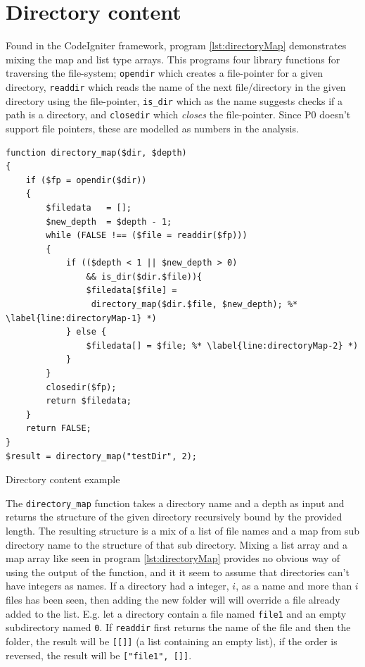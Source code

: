 \section{Directory content}
\label{sec:directoryContent}
Found in the CodeIgniter framework, program \ref{lst:directoryMap} demonstrates mixing the map and list type arrays. This programs four library functions for traversing the file-system; \texttt{opendir} which creates a file-pointer for a given directory, \texttt{readdir} which reads the name of the next file/directory in the given directory using the file-pointer, \texttt{is\_dir} which as the name suggests checks if a path is a directory, and \texttt{closedir} which \emph{closes} the file-pointer. Since P0 doesn't support file pointers, these are modelled as numbers in the analysis. 


\begin{program}
\begin{lstlisting}
function directory_map($dir, $depth)
{
    if ($fp = opendir($dir))
    {
        $filedata	= [];
        $new_depth	= $depth - 1;
        while (FALSE !== ($file = readdir($fp)))
        {
            if (($depth < 1 || $new_depth > 0) 
                && is_dir($dir.$file)){
                $filedata[$file] = 
                 directory_map($dir.$file, $new_depth); %* \label{line:directoryMap-1} *)
            } else {
                $filedata[] = $file; %* \label{line:directoryMap-2} *)
            }
        }
        closedir($fp);
        return $filedata;
    }
    return FALSE;
}
$result = directory_map("testDir", 2);
\end{lstlisting}
\caption{Directory content example}
\label{lst:directoryMap}
\end{program}


The \texttt{directory\_map} function takes a directory name and a depth as input and returns the structure of the given directory recursively bound by the provided length. The resulting structure is a mix of a list of file names and a map from sub directory name to the structure of that sub directory. Mixing a list array and a map array like seen in program \ref{lst:directoryMap} provides no obvious way of using the output of the function, and it it seem to assume that directories can't have integers as names. If a directory had a integer, $i$, as a name and more than $i$ files has been seen, then adding the new folder will will override a file already added to the list. E.g. let a directory contain a file named \texttt{file1} and an empty subdirectory named \texttt{0}. If \texttt{readdir} first returns the name of the file and then the folder, the result will be \texttt{[[]]} (a list containing an empty list), if the order is reversed, the result will be \texttt{["file1", []]}.

